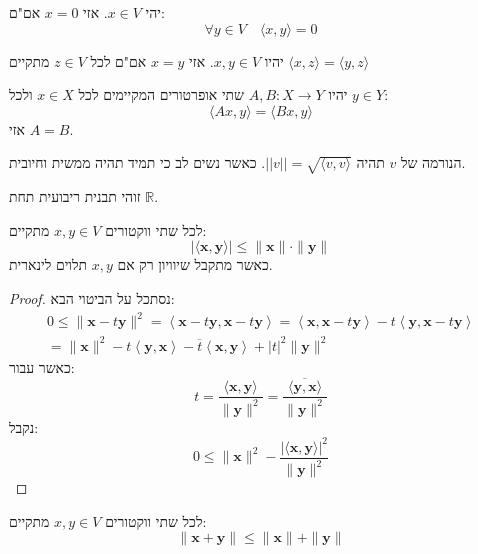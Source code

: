 \documentclass{tstextbook}
\begin{document}
\begin{proposition}
יהי \(x \in V\). אזי \(x=0\) אם"ם:
$$\forall y \in V\quad \langle x,y \rangle=0 $$

\end{proposition}
\begin{corollary}
יהיו \(x,y \in V\). אזי \(x=y\) אם"ם לכל \(z \in V\) מתקיים \(\langle x,z \rangle=\langle y,z \rangle\)

\end{corollary}
\begin{corollary}
יהיו \(A,B:X\to Y\) שתי אופרטורים המקיימים לכל \(x \in X\) ולכל \(y \in Y\):
$$\langle Ax,y \rangle =\langle Bx,y \rangle $$
אזי \(A=B\).

\end{corollary}
\begin{definition}[נורמה]
הנורמה של \(v\) תהיה \(||v|| = \sqrt{\langle v, v \rangle}\). כאשר נשים לב כי תמיד תהיה ממשית וחיובית.

\end{definition}
\begin{remark}
זוהי תבנית ריבועית תחת \(\mathbb{R}\).

\end{remark}
\begin{theorem}
לכל שתי ווקטורים \(x,y \in V\) מתקיים:
$$|\langle\mathbf{x},\mathbf{y}\rangle|\leq\|\mathbf{x}\|\cdot\|\mathbf{y}\|$$
כאשר מתקבל שיוויון רק אם \(x,y\) תלוים לינארית.

\end{theorem}
\begin{proof}
נסתכל על הביטוי הבא:
$$\begin{gather}0\leq\|\mathbf{x}-t\mathbf{y}\|^{2}=\left\langle \mathbf{x}-t\mathbf{y},\mathbf{x}-t\mathbf{y} \right\rangle=\left\langle \mathbf{x},\mathbf{x}-t\mathbf{y} \right\rangle-t\left\langle \mathbf{y},\mathbf{x}-t\mathbf{y} \right\rangle\\=\|\mathbf{x}\|^{2}-t\left\langle \mathbf{y},\mathbf{x} \right\rangle-\overline{t}\left\langle \mathbf{x},\mathbf{y} \right\rangle+|t|^{2}\|\mathbf{y}\|^{2} 
\end{gather}$$
כאשר עבור:
$$t={\frac{\langle\mathbf{x},\mathbf{y}\rangle}{\|\mathbf{y}\|^{2}}}={\frac{\overline{{\langle\mathbf{y},\mathbf{x}\rangle}}}{\|\mathbf{y}\|^{2}}}$$
נקבל:
$$0\leq\|\mathbf{x}\|^{2}-{\frac{|\langle\mathbf{x},\mathbf{y}\rangle|^{2}}{\|\mathbf{y}\|^{2}}}$$

\end{proof}
\begin{corollary}
לכל שתי ווקטורים \(x,y \in V\) מתקיים:
$$\|\mathbf{x}+\mathbf{y}\|\leq\|\mathbf{x}\|+\|\mathbf{y}\|$$

\end{corollary}
\end{document}
